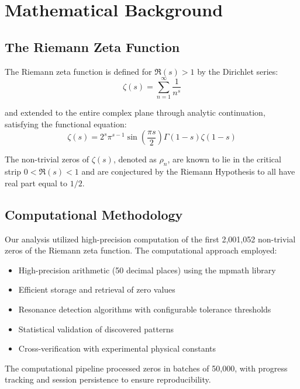 \documentclass[12pt, a4paper]{article}
\begin{document}
\section{Mathematical Background}

\subsection{The Riemann Zeta Function}

The Riemann zeta function is defined for $\Re(s) > 1$ by the Dirichlet series:
\begin{equation}
\zeta(s) = \sum_{n=1}^{\infty} \frac{1}{n^s}
\end{equation}

and extended to the entire complex plane through analytic continuation, satisfying the functional equation:
\begin{equation}
\zeta(s) = 2^s \pi^{s-1} \sin\left(\frac{\pi s}{2}\right) \Gamma(1-s) \zeta(1-s)
\end{equation}

The non-trivial zeros of $\zeta(s)$, denoted as $\rho_n$, are known to lie in the critical strip $0 < \Re(s) < 1$ and are conjectured by the Riemann Hypothesis to all have real part equal to $1/2$.

\subsection{Computational Methodology}

Our analysis utilized high-precision computation of the first 2,001,052 non-trivial zeros of the Riemann zeta function. The computational approach employed:

\begin{itemize}
\item High-precision arithmetic (50 decimal places) using the mpmath library
\item Efficient storage and retrieval of zero values
\item Resonance detection algorithms with configurable tolerance thresholds
\item Statistical validation of discovered patterns
\item Cross-verification with experimental physical constants
\end{itemize}

The computational pipeline processed zeros in batches of 50,000, with progress tracking and session persistence to ensure reproducibility.
\end{document}
